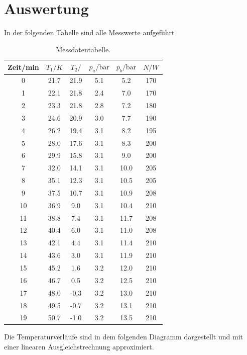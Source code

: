 \section{Auswertung}
\label{sec:Auswertung}
In der folgenden Tabelle sind alle Messwerte aufgeführt \\
\begin{table}
  \centering
  \begin{tabular}{c c c c c c}
    \toprule
    Zeit/min & $T_1/K$ & $T_2/$ & $p_a/\text{bar}$ & $p_b/\text{bar}$ & $N/W$ \\
    \midrule
    0 &  21.7  & 21.9 &  5.1 &  5.2  & 170 \\
    1 &  22.1  & 21.8 &  2.4 &  7.0  & 170 \\
    2 &  23.3  & 21.8 &  2.8 &  7.2  & 180 \\
    3 &  24.6  & 20.9 &  3.0 &  7.7  & 190 \\
    4 &  26.2  & 19.4 &  3.1 &  8.2  & 195 \\
    5 &  28.0  & 17.6 &  3.1 &  8.3  & 200 \\
    6 &  29.9  & 15.8 &  3.1 &  9.0  & 200 \\
    7 &  32.0  & 14.1 &  3.1 & 10.0  & 205 \\
    8 &  35.1  & 12.3 &  3.1 & 10.5  & 205 \\
    9 &  37.5  & 10.7 &  3.1 & 10.9  & 208 \\
   10 &  36.9  &  9.0 &  3.1 & 10.4  & 210 \\
   11 &  38.8  &  7.4 &  3.1 & 11.7  & 208 \\
   12 &  40.4  &  6.0 &  3.1 & 11.0  & 208 \\
   13 &  42.1  &  4.4 &  3.1 & 11.4  & 210 \\
   14 &  43.6  &  3.0 &  3.1 & 11.9  & 210 \\
   15 &  45.2  &  1.6 &  3.2 & 12.0  & 210 \\
   16 &  46.7  &  0.5 &  3.2 & 12.5  & 210 \\
   17 &  48.0  & -0.3 &  3.2 & 13.0  & 210 \\
   18 &  49.5  & -0.7 &  3.2 & 13.1  & 210 \\
   19 &  50.7  & -1.0 &  3.2 & 13.5  & 210 \\
   \bottomrule
  \end{tabular}
  \caption{Messdatentabelle.}
  \label{tab:Data}
\end{table}

Die Temperaturverläufe sind in dem folgenden Diagramm dargestellt und mit einer
linearen Ausgleichstrechnung approximiert.
